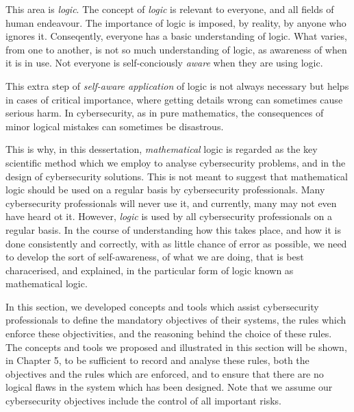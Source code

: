 This area is {\em logic}. The concept of {\em logic} is relevant to everyone, and all fields of human endeavour. The importance of logic is imposed, by reality, by anyone who ignores it. Conseqently, everyone has a basic understanding of logic. What varies, from one to another, is not so much understanding of logic, as awareness of when it is in use. Not everyone is self-conciously {\em aware} when they are using logic.

This extra step of {\em self-aware application} of logic is not always necessary but helps in cases of critical importance, where getting details wrong can sometimes cause serious harm. In cybersecurity, as in pure mathematics, the consequences of minor logical mistakes can sometimes be disastrous. 

This is why, in this dessertation, {\em mathematical} logic is regarded as the key scientific method which we employ to analyse cybersecurity problems, and in the design of cybersecurity solutions.
\if
This is not meant to suggest that mathematical logic should be used on a regular basis by cybersecurity professionals. Many cybersecurity professionals will never use it, and currently, many may not even have heard ot it. However, {\em logic} is used by all cybersecurity professionals on a regular basis. In the course of understanding how this takes place, and how it is done consistently and correctly, with as little chance of error as possible, we need to develop the sort of self-awareness, of what we are doing, that is best characerised, and explained, in the particular form of logic known as mathematical logic.

In this section, we developed concepts and tools which assist cybersecurity professionals to define the mandatory objectives of their systems, the rules which enforce these objectivities, and the reasoning behind the choice of these rules. The concepts and tools we proposed and illustrated in this section will be shown, in Chapter 5, to be sufficient to record and analyse these rules, both the objectives and the rules which are enforced, and to ensure that there are no logical flaws in the system which has been designed. Note that we assume our cybersecurity objectives include the control of all important risks. 
